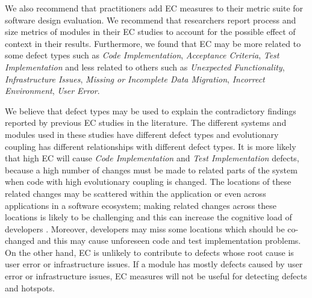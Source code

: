 \documentclass[times]{smrauth}
\begin{document}
We also recommend that practitioners add EC measures to their metric suite for software design evaluation. We recommend that researchers report process and size metrics of modules in their EC studies to account for the possible effect of context in their results. Furthermore, we found that EC may be more related to some defect types such as \textit{Code Implementation}, \textit{Acceptance Criteria}, \textit{Test Implementation} and less related to others such as \textit{Unexpected Functionality}, \textit{Infrastructure Issues}, \textit{Missing or Incomplete Data Migration}, \textit{Incorrect Environment}, \textit{User Error}. 

We believe that defect types may be used to explain the contradictory findings reported by previous EC studies in the literature. The different systems and modules used in these studies have different defect types and evolutionary coupling has different relationships with different defect types. It is more likely that high EC will cause \textit{Code Implementation} and \textit{Test Implementation} defects, because a high number of changes must be made to related parts of the system when code with high evolutionary coupling is changed. The locations of these related changes may be scattered within the application or even across applications in a software ecosystem; making related changes across these locations is likely to be challenging and this can increase the cognitive load of developers \cite{COGS:COGS57}. Moreover, developers may miss some locations which should be co-changed and this may cause unforeseen code and test implementation problems. On the other hand, EC is unlikely to contribute to defects whose root cause is user error or infrastructure issues. If a module has mostly defects caused by user error or infrastructure issues, EC measures will not be useful for detecting defects and hotspots.

\end{document}
